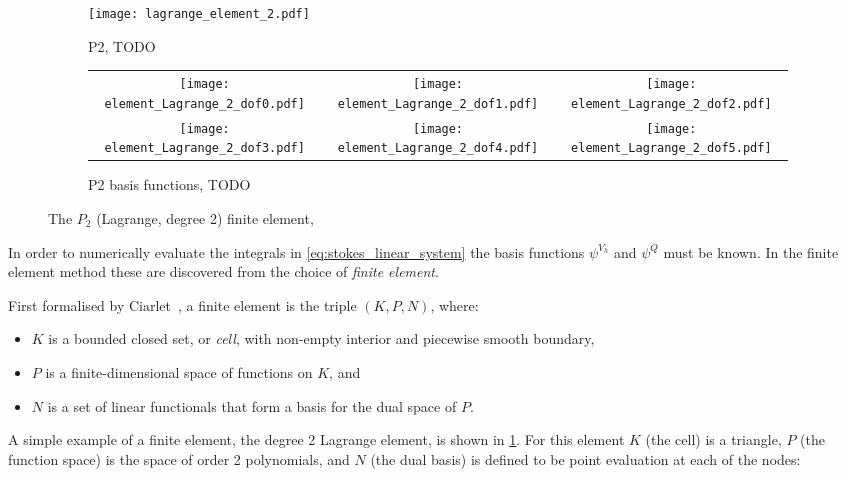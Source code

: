 \documentclass[thesis]{subfiles}
\begin{document}
\begin{figure}
  \centering
  \begin{subfigure}{.3\textwidth}
    \centering
    \texttt{[image: lagrange\_element\_2.pdf]}
    \caption{P2, TODO}
    \label{fig:lagrange_element_2}
  \end{subfigure}
  \begin{subfigure}{.68\textwidth}
    \centering
    \begin{tabular}{c c c}
      \texttt{[image: element\_Lagrange\_2\_dof0.pdf]}
      &
      \texttt{[image: element\_Lagrange\_2\_dof1.pdf]}
      &
      \texttt{[image: element\_Lagrange\_2\_dof2.pdf]}
      \\
      \texttt{[image: element\_Lagrange\_2\_dof3.pdf]}
      &
      \texttt{[image: element\_Lagrange\_2\_dof4.pdf]}
      &
      \texttt{[image: element\_Lagrange\_2\_dof5.pdf]}
    \end{tabular}
    \caption{P2 basis functions, TODO}
    \label{fig:lagrange_element_2_basis}
  \end{subfigure}
  \caption{The $P_2$ (Lagrange, degree 2) finite element, \cite{defelement}}
\end{figure}

In order to numerically evaluate the integrals in \cref{eq:stokes_linear_system} the basis functions $\psi^{V_h}$ and $\psi^Q$ must be known.
In the finite element method these are discovered from the choice of \textit{finite element}.

First formalised by Ciarlet~\parencite{ciarletElement2002}, a finite element is the triple $(K, P, N)$, where:

\begin{itemize}
  \item $K$ is a bounded closed set, or \textit{cell}, with non-empty interior and piecewise smooth boundary,
  \item $P$ is a finite-dimensional space of functions on $K$, and
  \item $N$ is a set of linear functionals that form a basis for the dual space of $P$.
\end{itemize}

A simple example of a finite element, the degree 2 Lagrange element, is shown in \cref{fig:lagrange_element_2}.
For this element $K$ (the cell) is a triangle, $P$ (the function space) is the space of order 2 polynomials, and $N$ (the dual basis) is defined to be point evaluation at each of the nodes:
\end{document}
